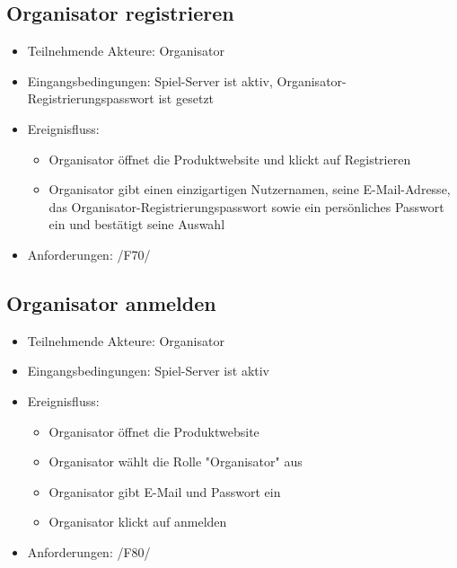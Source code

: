 \documentclass[a4paper]{scrreprt}
\begin{document}
    \subsection{Organisator registrieren}
    \begin{itemize}
        \item Teilnehmende Akteure: \Gls{Organisator}
        \item Eingangsbedingungen: Spiel-Server ist aktiv, Organisator-Registrierungspasswort ist gesetzt
        \item Ereignisfluss:
        \begin{itemize}
            \item \Gls{Organisator} öffnet die Produktwebsite und klickt auf Registrieren
            \item \Gls{Organisator} gibt einen einzigartigen Nutzernamen, seine E-Mail-Adresse, das Organisator-Registrierungspasswort sowie ein persönliches Passwort ein und bestätigt seine Auswahl
        \end{itemize}
        \item Anforderungen: /F70/
    \end{itemize}

    \subsection{Organisator anmelden}
    \begin{itemize}
        \item Teilnehmende Akteure: \Gls{Organisator}
        \item Eingangsbedingungen: Spiel-Server ist aktiv
        \item Ereignisfluss:
        \begin{itemize}
            \item \Gls{Organisator} öffnet die Produktwebsite
            \item \Gls{Organisator} wählt die Rolle "\Gls{Organisator}" aus
            \item \Gls{Organisator} gibt E-Mail und Passwort ein
            \item \Gls{Organisator} klickt auf anmelden
        \end{itemize}
        \item Anforderungen: /F80/
    \end{itemize}
\end{document}
